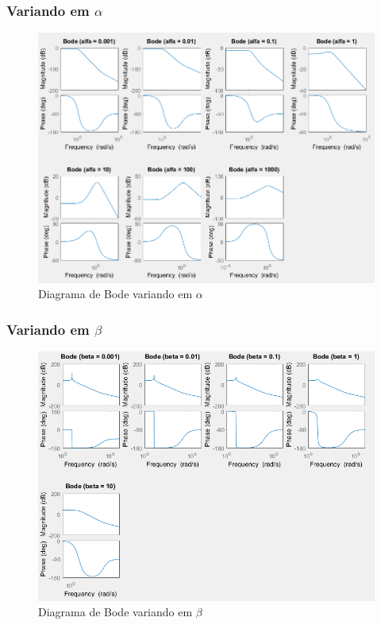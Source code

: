 \documentclass[a4paper, 12pt]{article}
\begin{document}
			\subsubsection{Variando em $\alpha$}
			\begin{figure}[!ht]
				\centering
				\includegraphics[scale=0.42]{img/3c_alfa.png}
				\caption{Diagrama de Bode variando em $\alpha$}	
			\end{figure}				
			\subsubsection{Variando em $\beta$}	
			\begin{figure}[!ht]
				\centering
				\includegraphics[scale=0.46]{img/3c_beta.png}
				\caption{Diagrama de Bode variando em $\beta$}	
			\end{figure}			
\end{document}
